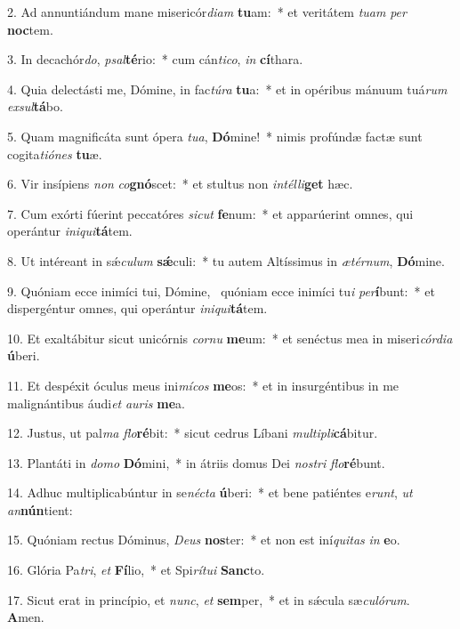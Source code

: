 2. Ad annuntiándum mane misericór\textit{di}\textit{am} \textbf{tu}am:~*  et veritátem \textit{tu}\textit{am} \textit{per} \textbf{noc}tem.\

3. In decachór\textit{do}, \textit{psal}\textbf{té}rio:~*  cum cán\textit{ti}\textit{co}, \textit{in} \textbf{cí}thara.\

4. Quia delectásti me, Dómine, in fac\textit{tú}\textit{ra} \textbf{tu}a:~*  et in opéribus mánuum tuá\textit{rum} \textit{ex}\textit{sul}\textbf{tá}bo.\

5. Quam magnificáta sunt ópera \textit{tu}\textit{a}, \textbf{Dó}mine!~*  nimis profúndæ factæ sunt cogita\textit{ti}\textit{ó}\textit{nes} \textbf{tu}æ.\

6. Vir insípiens \textit{non} \textit{co}\textbf{gnó}scet:~*  et stultus non \textit{in}\textit{tél}\textit{li}\textbf{get} hæc.\

7. Cum exórti fúerint peccatóres \textit{sic}\textit{ut} \textbf{fe}num:~*  et apparúerint omnes, qui operántur \textit{in}\textit{i}\textit{qui}\textbf{tá}tem.\

8. Ut intéreant in sǽ\textit{cu}\textit{lum} \textbf{sǽ}culi:~*  tu autem Altíssimus in \textit{æ}\textit{tér}\textit{num}, \textbf{Dó}mine.\

9. Quóniam ecce inimíci tui, Dómine, \dag\  quóniam ecce inimíci tu\textit{i} \textit{per}\textbf{í}bunt:~*  et dispergéntur omnes, qui operántur \textit{in}\textit{i}\textit{qui}\textbf{tá}tem.\

10. Et exaltábitur sicut unicórnis \textit{cor}\textit{nu} \textbf{me}um:~*  et senéctus mea in miseri\textit{cór}\textit{di}\textit{a} \textbf{ú}beri.\

11. Et despéxit óculus meus ini\textit{mí}\textit{cos} \textbf{me}os:~*  et in insurgéntibus in me malignántibus áudi\textit{et} \textit{au}\textit{ris} \textbf{me}a.\

12. Justus, ut pal\textit{ma} \textit{flo}\textbf{ré}bit:~*  sicut cedrus Líbani \textit{mul}\textit{ti}\textit{pli}\textbf{cá}bitur.\

13. Plantáti in \textit{do}\textit{mo} \textbf{Dó}mini,~*  in átriis domus Dei \textit{nos}\textit{tri} \textit{flo}\textbf{ré}bunt.\

14. Adhuc multiplicabúntur in se\textit{néc}\textit{ta} \textbf{ú}beri:~*  et bene patiéntes e\textit{runt}, \textit{ut} \textit{an}\textbf{nún}tient:\

15. Quóniam rectus Dóminus, \textit{De}\textit{us} \textbf{nos}ter:~*  et non est iní\textit{qui}\textit{tas} \textit{in} \textbf{e}o.\

16. Glória Pa\textit{tri}, \textit{et} \textbf{Fí}lio,~*  et Spi\textit{rí}\textit{tu}\textit{i} \textbf{Sanc}to.\

17. Sicut erat in princípio, et \textit{nunc}, \textit{et} \textbf{sem}per,~*  et in sǽcula sæ\textit{cu}\textit{ló}\textit{rum}. \textbf{A}men.\

